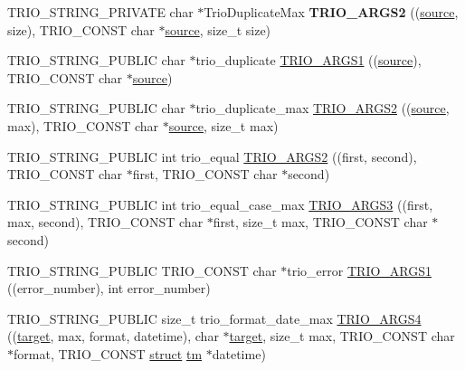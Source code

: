 \begin{DoxyCompactItemize}
\item 
\mbox{\label{group___static_strings_ga82970047f8fd45583a833aa3163a2932}} 
T\+R\+I\+O\+\_\+\+S\+T\+R\+I\+N\+G\+\_\+\+P\+R\+I\+V\+A\+TE char $\ast$Trio\+Duplicate\+Max {\bfseries T\+R\+I\+O\+\_\+\+A\+R\+G\+S2} ((\hyperlink{structsource}{source}, size), T\+R\+I\+O\+\_\+\+C\+O\+N\+ST char $\ast$\hyperlink{structsource}{source}, size\+\_\+t size)
\item 
T\+R\+I\+O\+\_\+\+S\+T\+R\+I\+N\+G\+\_\+\+P\+U\+B\+L\+IC char $\ast$trio\+\_\+duplicate \hyperlink{group___static_strings_ga8b1decd512168ca86f9e01580681a7be}{T\+R\+I\+O\+\_\+\+A\+R\+G\+S1} ((\hyperlink{structsource}{source}), T\+R\+I\+O\+\_\+\+C\+O\+N\+ST char $\ast$\hyperlink{structsource}{source})
\item 
T\+R\+I\+O\+\_\+\+S\+T\+R\+I\+N\+G\+\_\+\+P\+U\+B\+L\+IC char $\ast$trio\+\_\+duplicate\+\_\+max \hyperlink{group___static_strings_ga74465c7cbc62a01224a71ef6a5df4c88}{T\+R\+I\+O\+\_\+\+A\+R\+G\+S2} ((\hyperlink{structsource}{source}, max), T\+R\+I\+O\+\_\+\+C\+O\+N\+ST char $\ast$\hyperlink{structsource}{source}, size\+\_\+t max)
\item 
T\+R\+I\+O\+\_\+\+S\+T\+R\+I\+N\+G\+\_\+\+P\+U\+B\+L\+IC int trio\+\_\+equal \hyperlink{group___static_strings_ga1d744e13e6729724acec0f8ae113402d}{T\+R\+I\+O\+\_\+\+A\+R\+G\+S2} ((first, second), T\+R\+I\+O\+\_\+\+C\+O\+N\+ST char $\ast$first, T\+R\+I\+O\+\_\+\+C\+O\+N\+ST char $\ast$second)
\item 
T\+R\+I\+O\+\_\+\+S\+T\+R\+I\+N\+G\+\_\+\+P\+U\+B\+L\+IC int trio\+\_\+equal\+\_\+case\+\_\+max \hyperlink{group___static_strings_ga2ca5e9fd83b79a7cffb1c86332732e3b}{T\+R\+I\+O\+\_\+\+A\+R\+G\+S3} ((first, max, second), T\+R\+I\+O\+\_\+\+C\+O\+N\+ST char $\ast$first, size\+\_\+t max, T\+R\+I\+O\+\_\+\+C\+O\+N\+ST char $\ast$second)
\item 
T\+R\+I\+O\+\_\+\+S\+T\+R\+I\+N\+G\+\_\+\+P\+U\+B\+L\+IC T\+R\+I\+O\+\_\+\+C\+O\+N\+ST char $\ast$trio\+\_\+error \hyperlink{group___static_strings_gaa97797190efd0bb9a4b877980ce72a3b}{T\+R\+I\+O\+\_\+\+A\+R\+G\+S1} ((error\+\_\+number), int error\+\_\+number)
\item 
T\+R\+I\+O\+\_\+\+S\+T\+R\+I\+N\+G\+\_\+\+P\+U\+B\+L\+IC size\+\_\+t trio\+\_\+format\+\_\+date\+\_\+max \hyperlink{group___static_strings_ga6bc2982c5f034cfe1796efede60863d5}{T\+R\+I\+O\+\_\+\+A\+R\+G\+S4} ((\hyperlink{interfacevoid}{target}, max, format, datetime), char $\ast$\hyperlink{interfacevoid}{target}, size\+\_\+t max, T\+R\+I\+O\+\_\+\+C\+O\+N\+ST char $\ast$format, T\+R\+I\+O\+\_\+\+C\+O\+N\+ST \hyperlink{interfacestruct}{struct} \hyperlink{structtm}{tm} $\ast$datetime)

\end{DoxyCompactItemize}
